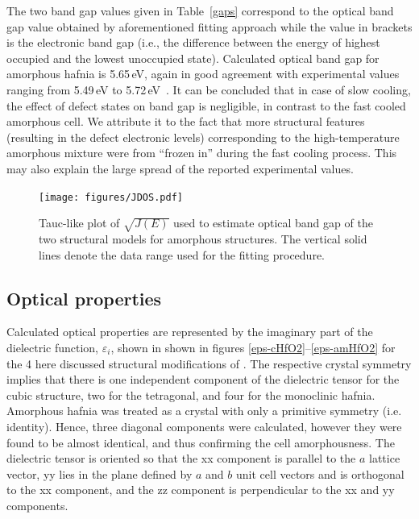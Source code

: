 \documentclass[10pt,a4paper,twocolumn]{article}
\begin{document}
The two band gap values given in Table~\ref{gaps} correspond to the optical band gap value obtained by aforementioned fitting approach while the value in brackets is the electronic band gap (i.e., the difference between the energy of highest occupied and the lowest unoccupied state).
Calculated optical band gap for amorphous hafnia is 5.65\,eV, again in good agreement with experimental values ranging from 5.49\,eV to 5.72\,eV~\cite{Takeuchi2004, Nguyen2005, Perevalov2007}.
It can be concluded that in case of slow cooling, the effect of defect states on band gap is negligible, in contrast to the fast cooled amorphous cell. We attribute it to the fact that more structural features (resulting in the defect electronic levels) corresponding to the high-temperature amorphous mixture were from ``frozen in'' during the fast cooling process.
This may also explain the large spread of the reported experimental values.

\begin{figure}
\begin{center}
	\texttt{[image: figures/JDOS.pdf]}
	\caption{Tauc-like plot of $\sqrt{J(E)}$ used to estimate optical band gap of the two structural models for amorphous structures. The vertical solid lines denote the data range used for the fitting procedure.}
   \label{JDOS}
\end{center}
\end{figure}

\subsection{Optical properties}

Calculated optical properties are represented by the imaginary part of the dielectric function, $\varepsilon_i$, shown in shown in figures \ref{eps-cHfO2}--\ref{eps-amHfO2} for the 4 here discussed structural modifications of .
The respective crystal symmetry implies that there is one independent component of the dielectric tensor for the cubic structure, two for the tetragonal, and four for the monoclinic hafnia.
Amorphous hafnia was treated as a crystal with only a primitive symmetry (i.e. identity). 
Hence, three diagonal components were calculated, however they were found to be almost identical, and thus confirming the cell amorphousness.
The dielectric tensor is oriented so that the xx component is parallel to the $a$ lattice vector, yy lies in the plane defined by $a$ and $b$ unit cell vectors and is orthogonal to the xx component, and the zz component is perpendicular to the xx and yy components.
\end{document}
